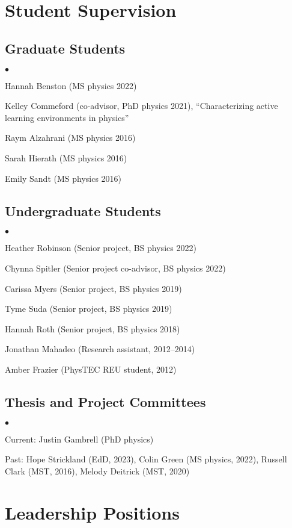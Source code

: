\documentclass[a4paper,10pt]{article}
\newcommand{\squishlist}{
	\begin{list}{$\bullet$}
		{ \setlength{\itemsep}{0pt}
			\setlength{\parsep}{3pt}
			\setlength{\topsep}{3pt}
			\setlength{\partopsep}{0pt}
			\setlength{\labelwidth}{1em}
			\setlength{\labelsep}{0.5em} } }
\newcommand{\squishend}{
\end{list}  }
\begin{document}
\section*{Student Supervision}

\subsection*{Graduate Students}
\squishlist
\item Hannah Benston (MS physics 2022)
\item Kelley Commeford (co-advisor, PhD physics 2021), ``Characterizing active learning environments in physics''
\item Raym Alzahrani (MS physics 2016)
\item Sarah Hierath (MS physics 2016)
\item Emily Sandt (MS physics 2016)
\squishend

\subsection*{Undergraduate Students}
\squishlist
\item Heather Robinson (Senior project, BS physics 2022)
\item Chynna Spitler (Senior project co-advisor, BS physics 2022)
\item Carissa Myers (Senior project, BS physics 2019)
\item Tyme Suda (Senior project, BS physics 2019)
\item Hannah Roth (Senior project, BS physics 2018)
\item Jonathan Mahadeo (Research assistant, 2012--2014)
\item Amber Frazier (PhysTEC REU student, 2012)
\squishend

\subsection*{Thesis and Project Committees}
\squishlist
\item Current: Justin Gambrell (PhD physics)
\item Past: Hope Strickland (EdD, 2023), Colin Green (MS physics, 2022), Russell Clark (MST, 2016), Melody Deitrick (MST, 2020)
\squishend


\section*{Leadership Positions}
\end{document}
